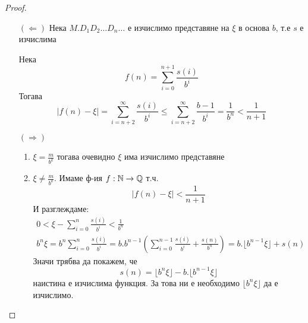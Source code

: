 \begin{proof}
    \begin{itemize}
        \item[$(\Leftarrow)$] Нека $M.D_1 D_2 \dots D_n \dots$ е изчислимо представяне на $\xi$ в основа $b$, т.е $s$ е изчислима
        
        Нека
        \begin{equation*}
            f(n) = \sum\limits_{i=0}^{n+1} \frac{s(i)}{b^i}
        \end{equation*}
        Тогава 
        \begin{equation*}
            |f(n) - \xi| = \sum\limits_{i=n+2}^\infty \frac{s(i)}{b^i} \leq \sum\limits_{i=n+2}^\infty \frac{b-1}{b^i} = \frac{1}{b^n} < \frac{1}{n+1}
        \end{equation*}

        \item[$(\Rightarrow)$] 
        \begin{enumerate}
            \item $\xi = \frac{m}{b^k}$ тогава очевидно $\xi$ има изчислимо представяне
            \item $\xi \neq \frac{m}{b^k}$. Имаме ф-ия $f: {\mathbb{N}} \to {\mathbb{Q}}$ т.ч.
            \begin{equation*}
                |f(n) - \xi| < \frac{1}{n+1} 
            \end{equation*}
            И разглеждаме:
            \begin{equation*}
                \begin{split}
                    0 < \xi - \sum\limits_{i=0}^{n} \frac{s(i)}{b^i} < \frac{1}{b^n} \\
                    b^n \xi = b^n \sum\limits_{i=0}^n \frac{s(i)}{b^i} = b.b^{n-1}\left(\sum\limits_{i=0}^{n-1} \frac{s(i)}{b^i} + \frac{s(n)}{b^n}\right) = b.\lfloor b^{n-1}\xi\rfloor + s(n)
                \end{split}
            \end{equation*}
            Значи трябва да покажем, че
            \begin{equation*}
                s(n) = \lfloor b^n \xi\rfloor - b.\lfloor b^{n-1}\xi\rfloor
            \end{equation*}
            наистина е изчислима функция. За това ни е необходимо $\lfloor b^n\xi\rfloor$ да е изчислимо.


\end{enumerate}
\end{itemize}
\end{proof}
